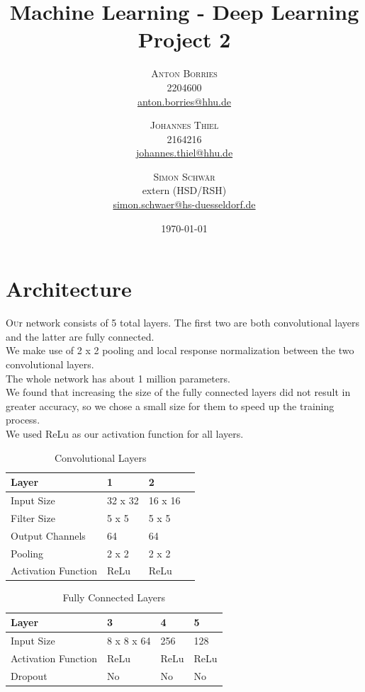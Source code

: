 \documentclass[twoside, twocolumn]{article}
\title{Machine Learning - Deep Learning Project 2} %
\author{%
\textsc{Anton Borries} \\[1ex]
\normalsize 2204600 \\
\normalsize  \href{mailto:anton.borries@hhu.de}{anton.borries@hhu.de}
\and
\textsc{Johannes Thiel} \\[1ex]
\normalsize 2164216 \\
\normalsize \href{mailto:johannes.thiel@hhu.de}{johannes.thiel@hhu.de}
\and
\textsc{Simon Schw\"ar} \\[1ex]
\normalsize extern (HSD/RSH) \\
\normalsize \href{mailto:simon.schwaer@hs-duesseldorf.de}{simon.schwaer@hs-duesseldorf.de}
}
\date{\today} %
\begin{document}
\maketitle


\section{Architecture}

\lettrine[nindent=.2em,lines=2]{O} ur network consists of 5 total layers. The first two are both convolutional layers and the latter are fully connected. \\
We make use of 2 x 2 pooling and local response normalization between the two convolutional layers. \\
The whole network has about 1 million parameters. \\
We found that increasing the size of the fully connected layers did not result in greater accuracy, so we chose a small size for them to speed up the training process. \\
We used ReLu as our activation function for all layers.

\begin{table}[htb]
\label{table_conv}
	\caption{Convolutional Layers}
	\centering
		\begin{tabular}{l l l l}
			Layer & 1 & 2 \\
			\midrule
			Input Size & 32 x 32 & 16 x 16 \\
			Filter Size & 5 x 5 & 5 x 5 \\
			Output Channels & 64 & 64 \\
			Pooling & 2 x 2 & 2 x 2 \\
			Activation Function & ReLu & ReLu \\
\end{tabular}
\end{table}

\begin{table}[htb]
\label{table_fcl}
	\caption{Fully Connected Layers}
	\centering
		\begin{tabular}{l l l l}
			Layer & 3 & 4 & 5\\
			\midrule
			Input Size & 8 x 8 x 64 & 256 & 128 \\
			Activation Function & ReLu & ReLu & ReLu \\
			Dropout & No & No & No\\
\end{tabular}
\end{table}
\end{document}
